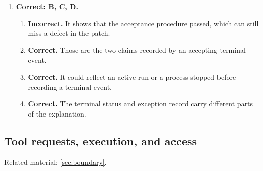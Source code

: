 \begin{enumerate}[start=21,itemsep=0.7\baselineskip]
\item[{\hyperref[exercise:30]{30.}}] \begin{minipage}[t]{\linewidth}
\textbf{Correct: B, C, D.}
\begin{enumerate}[label=\textnormal{(\Alph*)},leftmargin=*,itemsep=0pt]
\item \textbf{Incorrect.} It shows that the acceptance procedure passed, which can still miss a defect in the patch.
\item \textbf{Correct.} Those are the two claims recorded by an accepting terminal event.
\item \textbf{Correct.} It could reflect an active run or a process stopped before recording a terminal event.
\item \textbf{Correct.} The terminal status and exception record carry different parts of the explanation.
\end{enumerate}
\end{minipage}

\end{enumerate}

\subsection{Tool requests, execution, and access}
\noindent Related material: \cref{sec:boundary}.

